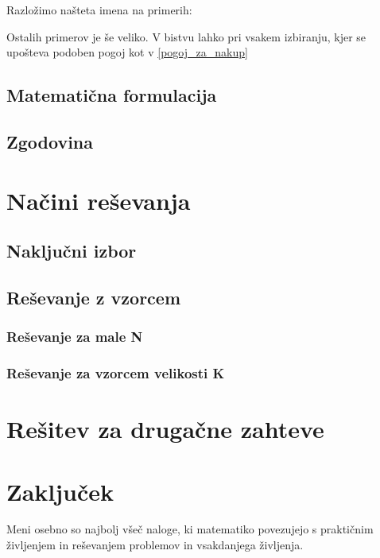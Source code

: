 \documentclass[a4paper, 12pt, titlepage]{article}
\begin{document}
Razložimo našteta imena na primerih:


Ostalih primerov je še veliko. V bistvu lahko pri vsakem izbiranju, kjer se upošteva podoben pogoj kot v \ref{pogoj_za_nakup}

\subsection{Matematična formulacija}


\subsection{Zgodovina}

\section{Načini reševanja}
\subsection{Naključni izbor}
\subsection{Reševanje z vzorcem}
\subsubsection{Reševanje za male N}
\subsubsection{Reševanje za vzorcem velikosti K}
\section{Rešitev za drugačne zahteve}

\section{Zaključek}

Meni osebno so najbolj všeč naloge, ki matematiko povezujejo s praktičnim življenjem in reševanjem problemov in vsakdanjega življenja.
\end{document}
